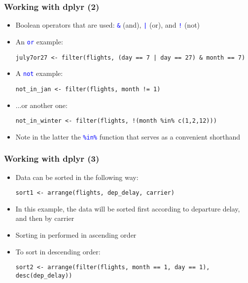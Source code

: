 \documentclass[10pt]{beamer}
\newcommand{\cc}[1]{\texttt{\textcolor{blue}{#1}}}
\theoremstyle{definition}
\begin{document}
\begin{frame}[fragile]
\frametitle{Working with \textbf{dplyr} (2)}
\begin{itemize}
	\item Boolean operators that are used: \cc{\&} (and), \cc{|} (or), and \cc{!} (not)
	\item An \cc{or} example:
	\begin{lstlisting}[style = rstyle, breaklines]
	july7or27 <- filter(flights, (day == 7 | day == 27) & month == 7)
	\end{lstlisting}
	\item A \cc{not} example:
	\begin{lstlisting}[style = rstyle, breaklines]
	not_in_jan <- filter(flights, month != 1)
	\end{lstlisting}
	\item ...or another one:
	\begin{lstlisting}[style = rstyle, breaklines]
	not_in_winter <- filter(flights, !(month %in% c(1,2,12)))
	\end{lstlisting}
	\item Note in the latter the \cc{\%in\%} function that serves as a convenient shorthand
\end{itemize}
\end{frame}

\begin{frame}[fragile]
\frametitle{Working with \textbf{dplyr} (3)}
\begin{itemize}
	\item Data can be sorted in the following way:
	\begin{lstlisting}[style = rstyle, breaklines]
	sort1 <- arrange(flights, dep_delay, carrier)	
	\end{lstlisting}
	\item In this example, the data will be sorted first according to departure delay, and then by carrier
	\item Sorting in performed in ascending order
	\item To sort in descending order:
	\begin{lstlisting}[style = rstyle, breaklines]
	sort2 <- arrange(filter(flights, month == 1, day == 1), desc(dep_delay))	
	\end{lstlisting}
\end{itemize}
\end{frame}
\end{document}
